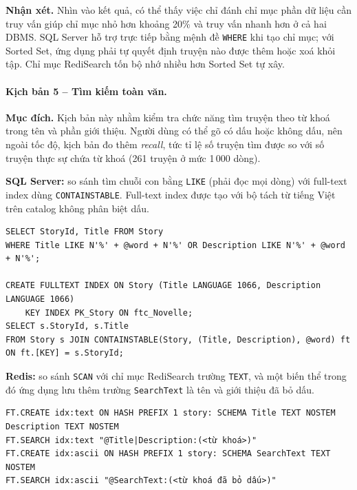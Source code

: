 \textbf{Nhận xét.} Nhìn vào kết quả, có thể thấy việc chỉ đánh chỉ mục phần dữ liệu cần truy vấn giúp chỉ mục nhỏ hơn khoảng 20\% và truy vấn nhanh hơn ở cả hai DBMS. SQL Server hỗ trợ trực tiếp bằng mệnh đề \texttt{WHERE} khi tạo chỉ mục; với Sorted Set, ứng dụng phải tự quyết định truyện nào được thêm hoặc xoá khỏi tập. Chỉ mục RediSearch tốn bộ nhớ nhiều hơn Sorted Set tự xây.

\paragraph{Kịch bản 5 -- Tìm kiếm toàn văn.}

\textbf{Mục đích.} Kịch bản này nhằm kiểm tra chức năng tìm truyện theo từ khoá trong tên và phần giới thiệu. Người dùng có thể gõ có dấu hoặc không dấu, nên ngoài tốc độ, kịch bản đo thêm \emph{recall}, tức tỉ lệ số truyện tìm được so với số truyện thực sự chứa từ khoá (261 truyện ở mức 1\,000 dòng).

\textbf{SQL Server:} so sánh tìm chuỗi con bằng \texttt{LIKE} (phải đọc mọi dòng) với full-text index dùng \texttt{CONTAINSTABLE}. Full-text index được tạo với bộ tách từ tiếng Việt trên catalog không phân biệt dấu.

\begin{verbatim}
SELECT StoryId, Title FROM Story
WHERE Title LIKE N'%' + @word + N'%' OR Description LIKE N'%' + @word + N'%';

CREATE FULLTEXT INDEX ON Story (Title LANGUAGE 1066, Description LANGUAGE 1066)
    KEY INDEX PK_Story ON ftc_Novelle;
SELECT s.StoryId, s.Title
FROM Story s JOIN CONTAINSTABLE(Story, (Title, Description), @word) ft ON ft.[KEY] = s.StoryId;
\end{verbatim}

\textbf{Redis:} so sánh \texttt{SCAN} với chỉ mục RediSearch trường \texttt{TEXT}, và một biến thể trong đó ứng dụng lưu thêm trường \texttt{SearchText} là tên và giới thiệu đã bỏ dấu.

\begin{verbatim}
FT.CREATE idx:text ON HASH PREFIX 1 story: SCHEMA Title TEXT NOSTEM Description TEXT NOSTEM
FT.SEARCH idx:text "@Title|Description:(<từ khoá>)"
FT.CREATE idx:ascii ON HASH PREFIX 1 story: SCHEMA SearchText TEXT NOSTEM
FT.SEARCH idx:ascii "@SearchText:(<từ khoá đã bỏ dấu>)"
\end{verbatim}

